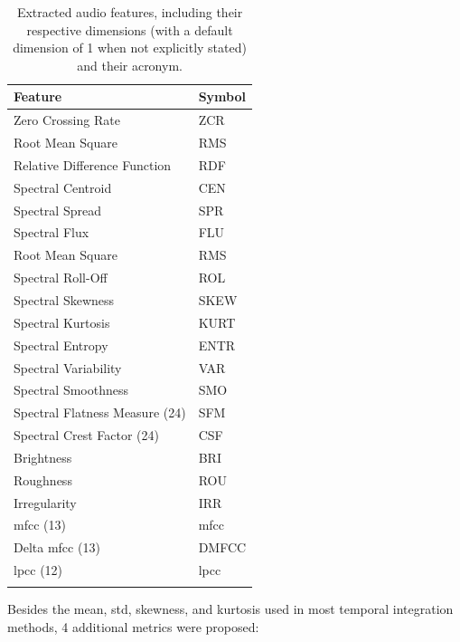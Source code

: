 \begin{table}[ht!]
    \caption[Features extracted in the BDLib2 dataset]{Extracted audio features, including their respective dimensions (with a default dimension of 1 when not explicitly stated) and their acronym.}
    \label{table:BDLib2_features_extracted}
    \centering
    \begin{tabular}{
        >{\centering\arraybackslash}m{} | >{\centering\arraybackslash}m{}}
        \Xhline{2\arrayrulewidth}
        \rowcolor{lightgray}
        \textbf{Feature} & \textbf{Symbol} \\
        \hline
        Zero Crossing Rate & ZCR \\
        Root Mean Square & RMS \\
        Relative Difference Function & RDF  \\
        Spectral Centroid  & CEN \\
        Spectral Spread & SPR\\
        Spectral Flux & FLU \\
        Root Mean Square & RMS \\
        Spectral Roll-Off & ROL \\
        Spectral Skewness & SKEW \\
        Spectral Kurtosis & KURT \\
        Spectral Entropy & ENTR \\
        Spectral Variability & VAR \\
        Spectral Smoothness & SMO \\
        Spectral Flatness Measure (24) & SFM \\
        Spectral Crest Factor (24) & CSF \\
        Brightness  & BRI \\
        Roughness & ROU \\
        Irregularity & IRR \\
        \gls{mfcc} (13) & \gls{mfcc} \\
        Delta \gls{mfcc} (13) & DMFCC \\
        \gls{lpcc} (12) & \gls{lpcc} \\
        \Xhline{2\arrayrulewidth}
    \end{tabular}
\end{table}

 Besides the mean, \gls{std}, skewness, and kurtosis used in most temporal integration methods, 4 additional metrics were proposed:

